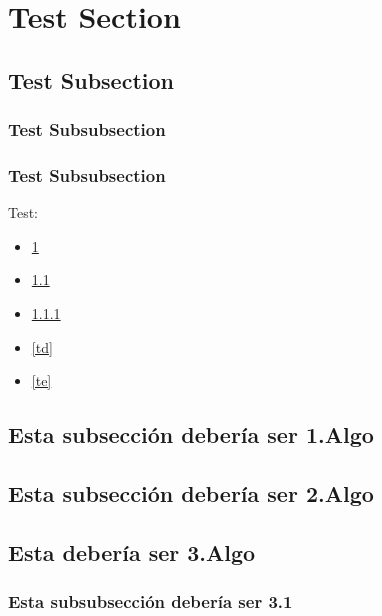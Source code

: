 \section{Test Section} \label{ta}
	\subsection{Test Subsection} \label{tb}
		\subsubsection{Test Subsubsection} \label{tc}
			 \label{td}
			 \label{te}
			
		\subsubsection{Test Subsubsection}
		
		Test:
		\begin{itemize}
			\item \ref{ta}
			\item \ref{tb}
			\item \ref{tc}
			\item \ref{td}
			\item \ref{te}
		\end{itemize}

	\subsection{Esta subsección debería ser 1.Algo}
	\subsection{Esta subsección debería ser 2.Algo}
	\subsection{Esta debería ser 3.Algo}
		\subsubsection{Esta subsubsección debería ser 3.1}
